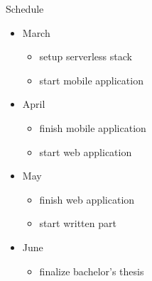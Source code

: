 \documentclass[aspectratio=1610]{beamer}
\begin{document}
  \begin{frame}{Schedule}
    \begin{itemize}
      \item March
        \begin{itemize}
          \item setup serverless stack
          \item start mobile application
        \end{itemize}
      \item April
        \begin{itemize}
          \item finish mobile application
          \item start web application
        \end{itemize}
      \item May
        \begin{itemize}
          \item finish web application
          \item start written part
        \end{itemize}
      \item June
        \begin{itemize}
          \item finalize bachelor’s thesis
        \end{itemize}
    \end{itemize}
  \end{frame}
\end{document}
